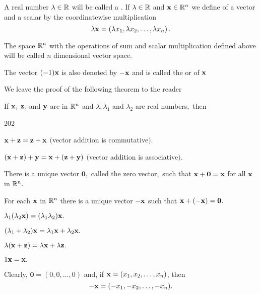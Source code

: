 \begin{df}A real number $\lambda\in\mathbb{R}$ will be called a .
If $\lambda\in\mathbb{R}$ and $\mathbf{ x}\in\mathbb{R}^n$ we define  of a vector and a scalar by   the
coordinatewise multiplication \begin{equation}\lambda\mathbf{ x} = \left(\lambda x_1, \lambda  x_2,
\dots, \lambda x_n \right).
\label{eq:scalar_multiplication}\end{equation}
\end{df}


The space $\mathbb{R}^n$ with the operations of sum and scalar multiplication defined above will be called $n$ dimensional vector space.

The vector $(-1)\mathbf{ x}$ is also denoted by $-\mathbf{ x}$ and is called the  or 
of $\mathbf{ x}$

We leave the proof of the following theorem to the reader
\begin{thm}\label{thmtype:5.1.2}
If $\mathbf{ x},$ $\mathbf{ z},$ and $\mathbf{ y}$ are in $\mathbb{R}^n$
and
$\lambda, \lambda_1$ and $\lambda_2$ are real numbers$,$ then
\begin{dingautolist}{202}
\item %
 $\mathbf{ x}+\mathbf{ z}=\mathbf{ z}+\mathbf{ x}$  $($vector addition
is commutative$).$
\item %
$(\mathbf{ x}+\mathbf{ z})+\mathbf{ y}=\mathbf{ x}+(\mathbf{ z}+\mathbf{ y})$
$($vector addition is associative$).$
\item %
 There is a unique vector $\mathbf{0},$ called the zero vector$,$
such that $\mathbf{ x}+\mathbf{0}=\mathbf{ x}$ for all $\mathbf{ x}$ in
$\mathbb{R}^n.$
\item %
 For each $\mathbf{ x}$ in $\mathbb{R}^n$ there is a unique vector
$-\mathbf{ x}$ such that $\mathbf{ x}+(-\mathbf{ x})=\mathbf{0}.$
\item %
 $\lambda_1(\lambda_2\mathbf{ x})=(\lambda_1 \lambda_2)\mathbf{ x}.$
\item %
$(\lambda_1+\lambda_2)\mathbf{ x}=\lambda_1\mathbf{ x}+\lambda_2\mathbf{ x}.$
\item %
 $\lambda(\mathbf{ x}+\mathbf{ z})=\lambda\mathbf{ x}+\lambda\mathbf{ z}.$
\item %
 $1\mathbf{ x}=\mathbf{ x}.$
\end{dingautolist}
\end{thm}

Clearly, $\mathbf{0}=(0,0, \dots,0)$ and, if
$\mathbf{ x}=(x_1,x_2, \dots,x_n)$, then
$$
-\mathbf{ x}=
(-x_1,-x_2, \dots,-x_n).
$$

